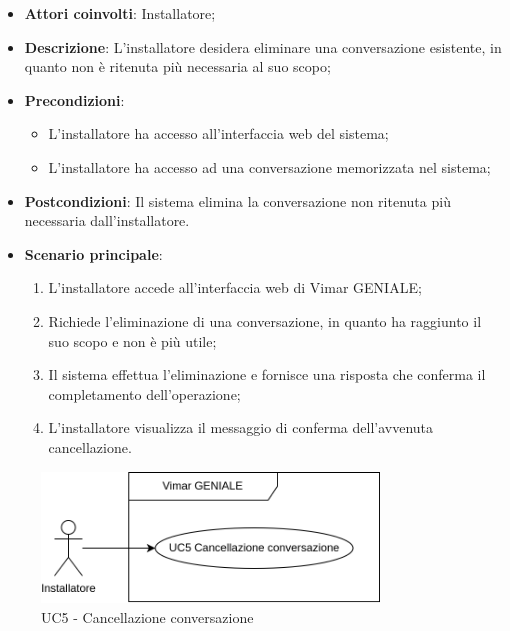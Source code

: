 \begin{itemize}
    \item \textbf{Attori coinvolti}: Installatore;
    \item \textbf{Descrizione}: L’installatore desidera eliminare una conversazione esistente, in quanto non è ritenuta più necessaria al suo scopo;
    \item \textbf{Precondizioni}: 
        \begin{itemize}
            \item L’installatore ha accesso all’interfaccia web del sistema;
            \item L’installatore ha accesso ad una conversazione memorizzata nel sistema;
        \end{itemize}
    \item \textbf{Postcondizioni}: Il sistema elimina la conversazione non ritenuta più necessaria dall’installatore.
    \item \textbf{Scenario principale}:
    \begin{enumerate}
    \item L’installatore accede all’interfaccia web di Vimar GENIALE;
    \item Richiede l’eliminazione di una conversazione, in quanto ha raggiunto il suo scopo e non è più utile;
    \item Il sistema effettua l’eliminazione e fornisce una risposta che conferma il completamento dell’operazione;
    \item L’installatore visualizza il messaggio di conferma dell’avvenuta cancellazione.
    \end{enumerate}
\end{itemize}
\begin{figure}[H]
\centering
\includegraphics[width=0.8\textwidth]{contents/casi_duso/png/UC5.png}
\caption{UC5 - Cancellazione conversazione}
\end{figure}


